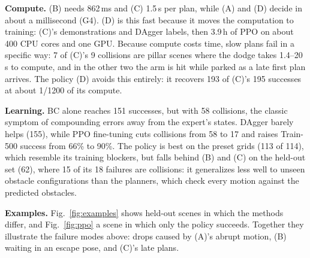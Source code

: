 \documentclass[conference]{IEEEtran}
\begin{document}
\textbf{Compute.} (B) needs 862\,ms and (C) 1.5\,s per plan, while (A) and (D) decide in about a
millisecond (G4). (D) is this fast because it moves the computation to training: (C)'s demonstrations and DAgger
labels, then 3.9\,h of PPO on about 400 CPU cores and one GPU. Because compute costs time, slow plans fail in a specific way: 7 of (C)'s 9 collisions
are pillar scenes where the dodge takes 1.4--20\,s to compute, and in the other two the arm is hit while
parked as a late first plan arrives. The policy (D) avoids this entirely: it recovers 193 of (C)'s 195
successes at about 1/1200 of its compute.

\textbf{Learning.} BC alone reaches 151 successes, but with 58 collisions, the classic symptom of
compounding errors away from the expert's states. DAgger barely helps (155), while PPO fine-tuning cuts
collisions from 58 to 17 and raises Train-500 success from 66\% to 90\%. The policy is best on the preset
grids (113 of 114), which resemble its training blockers, but falls behind (B) and (C) on the held-out
set (62), where 15 of its 18 failures are collisions: it generalizes less well to unseen obstacle
configurations than the planners, which check every motion against the predicted obstacles.

\textbf{Examples.} Fig.~\ref{fig:examples} shows held-out scenes in which the methods differ, and
Fig.~\ref{fig:ppo} a scene in which only the policy succeeds. Together they illustrate the failure modes
above: drops caused by (A)'s abrupt motion, (B) waiting in an escape pose, and (C)'s late plans.
\end{document}
